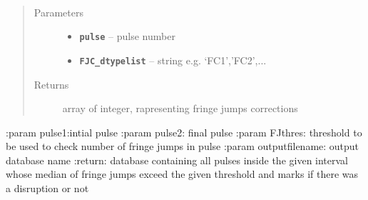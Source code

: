 \documentclass[letterpaper,10pt,english]{sphinxmanual}
\begin{document}

\begin{fulllineitems}
\label{status_flag:status_flag.GETfringejumps}~\begin{quote}\begin{description}
\item[{Parameters}] \leavevmode\begin{itemize}
\item {} 
\textbf{\texttt{pulse}} -- pulse number

\item {} 
\textbf{\texttt{FJC\_dtypelist}} -- string e.g. `FC1','FC2',...

\end{itemize}

\item[{Returns}] \leavevmode
array of integer, rapresenting fringe jumps corrections

\end{description}\end{quote}

\end{fulllineitems}


\begin{fulllineitems}
\label{status_flag:status_flag.main}
:param pulse1:intial pulse
:param pulse2: final pulse
:param FJthres: threshold to be used to check number of fringe jumps in pulse
:param outputfilename: output database name
:return: database containing all pulses inside the given interval whose median of fringe jumps exceed the given threshold and marks if there was a disruption or not

\end{fulllineitems}


\begin{fulllineitems}
\label{status_flag:status_flag.printdict}
\end{fulllineitems}
\end{document}
